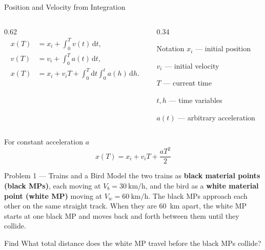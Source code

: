 \begin{frame}{Position and Velocity from Integration}
  \small
  \begin{columns}[T,onlytextwidth]
    \begin{column}{0.62\textwidth}
      \begin{align*}
        x(T)&=x_i+\int_0^T v(t)\,\mathrm{d}t,\\
        v(T)&=v_i+\int_0^T a(t)\,\mathrm{d}t,\\
        x(T)&=x_i+v_iT+\int_0^T\!\mathrm{d}t
          \int_0^t a(h)\,\mathrm{d}h.
      \end{align*}
    \end{column}
    \begin{column}{0.34\textwidth}
      \begin{block}{Notation}
        \footnotesize
        $x_i$ — initial position

        $v_i$ — initial velocity

        $T$ — current time

        $t,h$ — time variables

        $a(t)$ — arbitrary acceleration
      \end{block}
    \end{column}
  \end{columns}
  \vspace{0.35em}
  \begin{block}{For constant acceleration $a$}
    \[
      x(T)=x_i+v_iT+\frac{aT^2}{2}
    \]
  \end{block}
\end{frame}

\begin{frame}{Problem 1 — Trains and a Bird}
  \vspace{0.15em}
  \scriptsize
  Model the two trains as \textbf{black material points (black MPs)}, each
  moving at $V_b=\SI{30}{\kilo\metre\per\hour}$, and the bird as a
  \textbf{white material point (white MP)} moving at
  $V_w=\SI{60}{\kilo\metre\per\hour}$. The black MPs approach each other on
  the same straight track. When they are \SI{60}{\kilo\metre} apart, the white
  MP starts at one black MP and moves back and forth between them until they
  collide.
  \vspace{0.2em}
  \begin{block}{Find}
    What total distance does the white MP travel before the black MPs collide?
  \end{block}
  \vspace{-0.2em}
  \centering
  \resizebox{0.76\textwidth}{!}{}
\end{frame}

